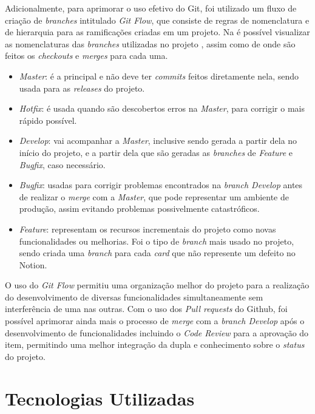 Adicionalmente, para aprimorar o uso efetivo do Git, foi utilizado um fluxo de criação de \textit{branches} intitulado \textit{Git Flow}, que consiste de regras de nomenclatura e de hierarquia para as ramificações criadas em um projeto. Na  é possível visualizar as nomenclaturas das \textit{branches} utilizadas no projeto \appName, assim como de onde são feitos os \textit{checkouts} e \textit{merges} para cada uma.


\begin{itemize}
    \item \textit{Master}: é a principal e não deve ter \textit{commits} feitos diretamente nela, sendo usada para as \textit{releases} do projeto. 
    \item \textit{Hotfix}: é usada quando são descobertos erros na \textit{Master}, para corrigir o mais rápido possível.
    \item \textit{Develop}: vai acompanhar a \textit{Master}, inclusive sendo gerada a partir dela no início do projeto, e a partir dela que são geradas as \textit{branches} de \textit{Feature} e \textit{Bugfix}, caso necessário.
    \item \textit{Bugfix}: usadas para corrigir problemas encontrados na \textit{branch Develop} antes de realizar o \textit{merge} com a \textit{Master}, que pode representar um ambiente de produção, assim evitando problemas possivelmente catastróficos.
    \item \textit{Feature}: representam os recursos incrementais do projeto como novas funcionalidades ou melhorias. Foi o tipo de \textit{branch} mais usado no projeto, sendo criada uma \textit{branch} para cada \textit{card} que não represente um defeito no Notion.
\end{itemize}

O uso do \textit{Git Flow} permitiu uma organização melhor do projeto para a realização do desenvolvimento de diversas funcionalidades simultaneamente sem interferência de uma nas outras. Com o uso dos \textit{Pull requests} do Github, foi possível aprimorar ainda mais o processo de \textit{merge} com a \textit{branch Develop} após o desenvolvimento de funcionalidades incluindo o \textit{Code Review} para a aprovação do item, permitindo uma melhor integração da dupla e conhecimento sobre o \textit{status} do projeto.

\section{Tecnologias Utilizadas}


